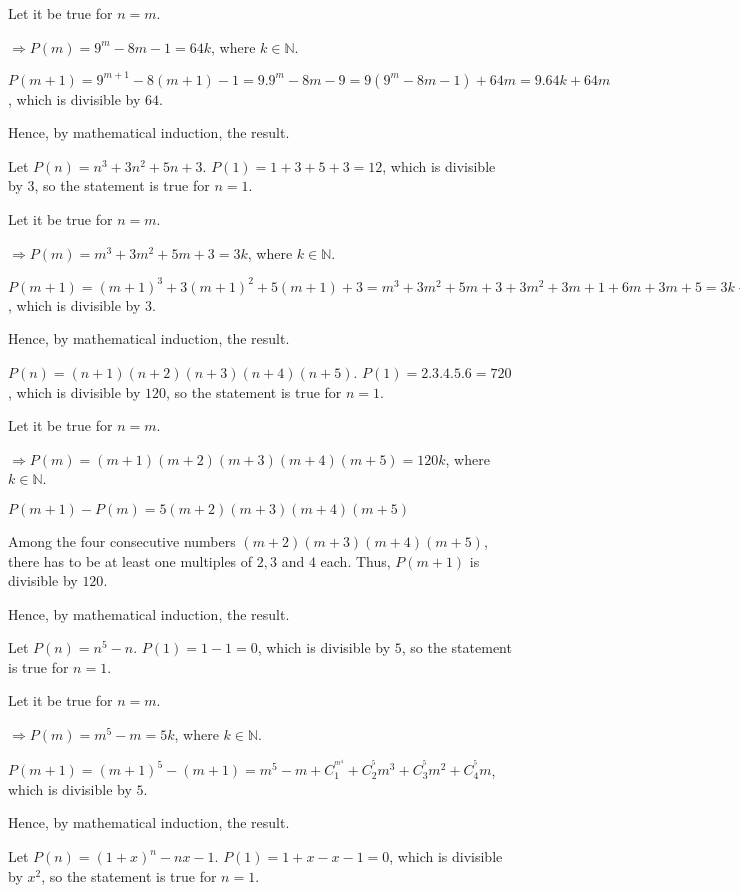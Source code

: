   Let it be true for $n = m$.

  $\Rightarrow P(m) = 9^m - 8m - 1 = 64k$, where $k\in\mathbb{N}$.

  $P(m + 1) = 9^{m + 1} - 8(m + 1) - 1 = 9.9^m - 8m - 9 = 9(9^m - 8m - 1) + 64m = 9.64k + 64m$, which is
  divisible by $64$.

  Hence, by mathematical induction, the result.
\item Let $P(n) = n^3 + 3n^2 + 5n + 3$. $P(1) = 1 + 3 + 5 + 3 = 12$, which is divisible by $3$, so the
  statement is true for $n = 1$.

  Let it be true for $n = m$.

  $\Rightarrow P(m) = m^3 + 3m^2 + 5m + 3 = 3k$, where $k\in\mathbb{N}$.

  $P(m + 1) = (m + 1)^3 + 3(m + 1)^2 + 5(m + 1) + 3 = m^3 + 3m^2 + 5m + 3 + 3m^2 + 3m + 1 + 6m + 3m + 5 = 3k
  + 3m^2 + 9m + 6$, which is divisible by $3$.

  Hence, by mathematical induction, the result.
\item $P(n) = (n + 1)(n + 2)(n + 3)(n + 4)(n + 5)$. $P(1) = 2.3.4.5.6 = 720$, which is divisible by $120$,
  so the statement is true for $n = 1$.

  Let it be true for $n = m$.

  $\Rightarrow P(m) = (m + 1)(m + 2)(m + 3)(m + 4)(m + 5) = 120k$, where $k\in\mathbb{N}$.

  $P(m + 1) - P(m) = 5(m + 2)(m + 3)(m + 4)(m + 5)$

  Among the four consecutive numbers $(m + 2)(m + 3)(m + 4)(m + 5)$, there has to be at least one multiples
  of $2, 3$ and $4$ each. Thus, $P(m + 1)$ is divisible by $120$.

  Hence, by mathematical induction, the result.
\item Let $P(n) = n^5 - n$. $P(1) = 1 - 1 = 0$, which is divisible by $5$, so the statement is true for $n =
  1$.

  Let it be true for $n = m$.

  $\Rightarrow P(m) = m^5 - m = 5k$, where $k\in\mathbb{N}$.

  $P(m  + 1) = (m + 1)^5 - (m + 1) = m^5 - m + C_1^^m^4 + C_2^^5m^3 + C_3^^5m^2 + C_4^^5m$, which is
  divisible by $5$.

  Hence, by mathematical induction, the result.
\item Let $P(n) = (1 + x)^n - nx - 1$. $P(1) = 1 + x - x - 1 = 0$, which is divisible by $x^2$, so the
  statement is true for $n = 1$.

